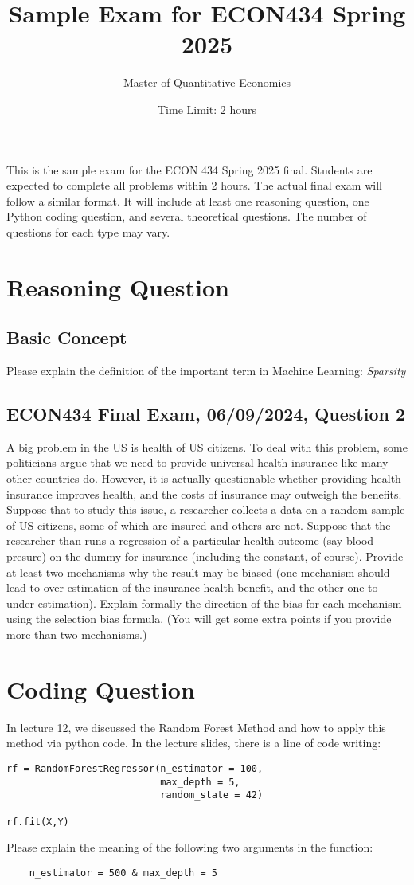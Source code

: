 \documentclass{article}
\title{Sample Exam for ECON434 Spring 2025}
\author{Master of Quantitative Economics}
\date{Time Limit: 2 hours}
\begin{document}
\maketitle
This is the sample exam for the ECON 434 Spring 2025 final. Students are expected to complete all problems within 2 hours. The actual final exam will follow a similar format. It will include at least one reasoning question, one Python coding question, and several theoretical questions. The number of questions for each type may vary.

\section{Reasoning Question}
\subsection{Basic Concept}
Please explain the definition of the important term in Machine Learning: \textit{Sparsity}
\subsection{ECON434 Final Exam, 06/09/2024, Question 2}
A big problem in the US is health of US citizens. To deal with this problem, some politicians argue that we need to provide universal health insurance like many other countries do. However, it is actually questionable whether providing health insurance improves health, and the costs of insurance may outweigh the benefits. Suppose that to study this issue, a researcher collects a data on a random sample of US citizens, some of which are insured and others are not. Suppose that the researcher than runs a regression of a particular health outcome (say blood presure) on the dummy for insurance (including the constant, of course). Provide at least two mechanisms why the result may be biased (one mechanism should lead to over-estimation of the insurance health benefit, and the other one to under-estimation). Explain formally
the direction of the bias for each mechanism using the selection bias formula. (You will get some extra points if you provide more than two mechanisms.)
\section{Coding Question}
In lecture 12, we discussed the Random Forest Method and how to apply this method via python code. In the lecture slides, there is a line of code writing:
\begin{center}
\begin{BVerbatim}
rf = RandomForestRegressor(n_estimator = 100, 
                           max_depth = 5,
                           random_state = 42)

rf.fit(X,Y)
\end{BVerbatim}
\end{center}
Please explain the meaning of the following two arguments in the function:
\begin{verbatim}
    n_estimator = 500 & max_depth = 5
\end{verbatim}
\end{document}
